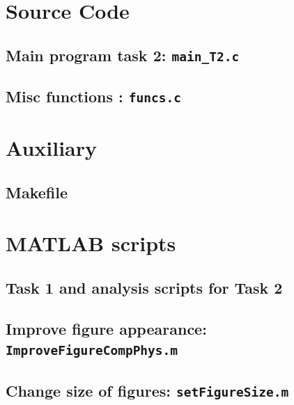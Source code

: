 \appendix

\section{Source Code}

%

%

\subsection{Main program task 2: \texttt{main\_T2.c}}



\subsection{Misc functions : \texttt{funcs.c}}


\section{Auxiliary }
\subsection{Makefile}


\section{MATLAB scripts}
\subsection{Task 1 and analysis scripts for Task 2}


\subsection{Improve figure appearance: \texttt{ImproveFigureCompPhys.m}}


\subsection{Change size of figures: \texttt{setFigureSize.m}}




